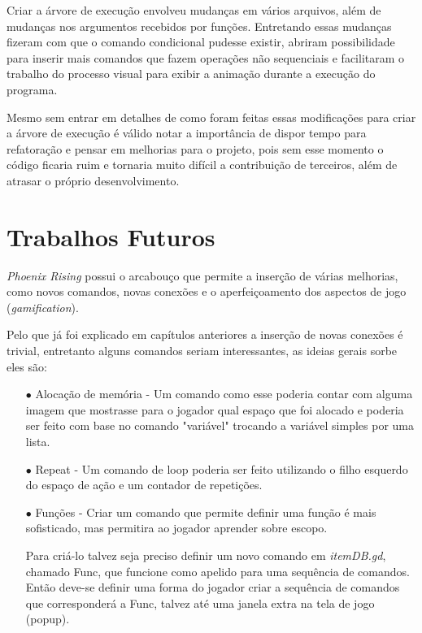 Criar a árvore de execução envolveu mudanças em vários arquivos, além de 
mudanças nos argumentos recebidos por funções. Entretando essas mudanças 
fizeram com que o comando condicional pudesse existir, abriram possibilidade 
para inserir mais comandos que fazem operações não sequenciais e facilitaram o 
trabalho do processo visual para exibir a animação durante a execução do 
programa.

Mesmo sem entrar em detalhes de como foram feitas essas modificações para 
criar a árvore de execução é válido notar a importância de dispor tempo 
para refatoração e pensar em melhorias para o projeto, pois sem esse 
momento o código ficaria ruim e tornaria muito difícil a 
contribuição de terceiros, além de atrasar o próprio desenvolvimento.

\section{Trabalhos Futuros}

\textit{Phoenix Rising} possui o arcabouço que permite a inserção de várias 
melhorias, como novos comandos, novas conexões e o aperfeiçoamento dos 
aspectos de jogo (\textit{gamification}).

Pelo que já foi explicado em capítulos anteriores a inserção de novas conexões é
trivial, entretanto alguns comandos seriam interessantes, as ideias gerais
sorbe eles são:

\begin{itemize}
    \item[$\bullet$]
        Alocação de memória - Um comando como esse poderia contar com 
        alguma imagem que mostrasse para o jogador qual espaço que foi alocado
        e poderia ser feito com base no comando "variável" trocando
        a variável simples por uma lista.
    \item[$\bullet$]
        Repeat - Um comando de loop poderia ser feito utilizando o filho 
        esquerdo do espaço de ação e um contador de repetições.
    \item[$\bullet$]
        Funções - Criar um comando que permite definir uma função é mais 
        sofisticado, mas permitira ao jogador aprender sobre escopo.
        
        Para criá-lo talvez seja preciso definir um novo comando em 
        \textit{itemDB.gd}, chamado Func, que funcione como apelido para uma 
        sequência de comandos. Então deve-se definir uma forma do jogador criar 
        a sequência de comandos que corresponderá a Func, talvez até uma janela 
        extra na tela de jogo (popup).
\end{itemize}

